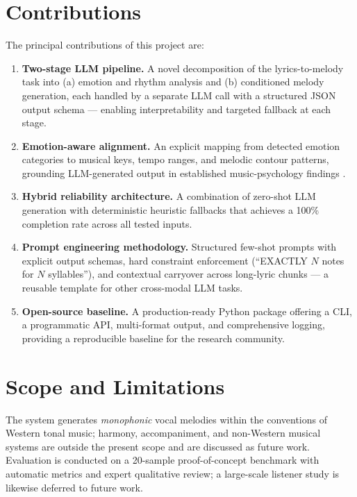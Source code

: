 \section{Contributions}
\label{sec:contributions}

The principal contributions of this project are:

\begin{enumerate}
    \item \textbf{Two-stage LLM pipeline.} A novel decomposition of the
    lyrics-to-melody task into (a) emotion and rhythm analysis and (b)
    conditioned melody generation, each handled by a separate LLM call with
    a structured JSON output schema --- enabling interpretability and
    targeted fallback at each stage.
    \item \textbf{Emotion-aware alignment.} An explicit mapping from detected
    emotion categories to musical keys, tempo ranges, and melodic contour
    patterns, grounding LLM-generated output in established music-psychology
    findings \cite{hevner36expression, juslin01musicemotion}.
    \item \textbf{Hybrid reliability architecture.} A combination of
    zero-shot LLM generation with deterministic heuristic fallbacks that
    achieves a 100\% completion rate across all tested inputs.
    \item \textbf{Prompt engineering methodology.} Structured few-shot
    prompts with explicit output schemas, hard constraint enforcement
    (``EXACTLY $N$ notes for $N$ syllables''), and contextual carryover
    across long-lyric chunks --- a reusable template for other cross-modal
    LLM tasks.
    \item \textbf{Open-source baseline.} A production-ready Python package
    offering a CLI, a programmatic API, multi-format output,
    and comprehensive logging, providing a reproducible baseline for the
    research community.
\end{enumerate}

\section{Scope and Limitations}
\label{sec:scope}

The system generates \emph{monophonic} vocal melodies within the conventions
of Western tonal music; harmony, accompaniment, and non-Western musical
systems are outside the present scope and are discussed as future work.
Evaluation is conducted on a 20-sample proof-of-concept benchmark with
automatic metrics and expert qualitative review; a large-scale listener
study is likewise deferred to future work.

